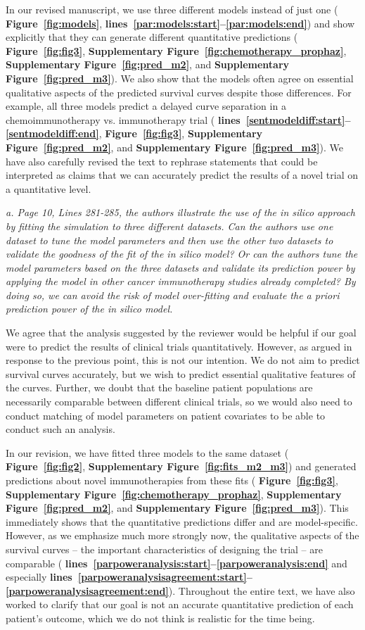 \documentclass{article}
\newcommand{\revr}[1]{{\color{gray} \itshape #1}}
\newcommand{\auth}[1]{{#1}}
\newcommand{\chng}[1]{{\color{blue!70!black} #1}}
\newcommand{\myref}[2]{{\bfseries\color{red!70!black} Figure~\ref{#1}#2}}
\newcommand{\mysupp}[2]{{\bfseries\color{red!70!black} Supplementary Figure~\ref{#1}#2}}
\newcommand{\lr}[1]{{\bfseries\color{red!70!black} lines~\ref{#1:start}--\ref{#1:end}}}
\begin{document}
\chng{In our revised manuscript, we use three different models instead of just one (\myref{fig:models}{},\lr{par:models}) and show explicitly that they can generate different quantitative predictions (\myref{fig:fig3}{}, \mysupp{fig:chemotherapy_prophaz}{}, \mysupp{fig:pred_m2}{}, and \mysupp{fig:pred_m3}{}). We also show that the models often agree on essential qualitative aspects of the predicted survival curves despite those differences. For example, all three models predict a delayed curve separation in a chemoimmunotherapy vs. immunotherapy trial (\lr{sentmodeldiff}, \myref{fig:fig3}{},  \mysupp{fig:pred_m2}{}, and \mysupp{fig:pred_m3}{}). We have also carefully revised the text to rephrase statements that could be interpreted as claims that we can accurately predict the results of a novel trial on a quantitative level.}

\revr{a. Page 10, Lines 281-285, the authors illustrate the use of the \emph{in silico} approach by fitting the simulation to three different datasets. Can the authors use one dataset to tune the model parameters and then use the other two datasets to validate the goodness of the fit of the in silico model? Or can the authors tune the model parameters based on the three datasets and validate its prediction power by applying the model in other cancer immunotherapy studies already completed? By doing so, we can avoid the risk of model over-fitting and evaluate the a priori prediction power of the in silico model.}

\auth{We agree that the analysis suggested by the reviewer would be helpful if our goal were to predict the results of clinical trials quantitatively. However, as argued in response to the previous point, this is not our intention. We do not aim to predict survival curves accurately, but we wish to predict essential qualitative features of the curves. Further, we doubt that the baseline patient populations are necessarily comparable between different clinical trials, so we would also need to conduct matching of model parameters on patient covariates to be able to conduct such an analysis.
}

\chng{
In our revision, we have fitted three models to the same dataset (\myref{fig:fig2}{},\mysupp{fig:fits_m2_m3}{}) and generated predictions about novel immunotherapies from these fits (\myref{fig:fig3}{}, \mysupp{fig:chemotherapy_prophaz}{}, \mysupp{fig:pred_m2}{}, and \mysupp{fig:pred_m3}{}). This immediately shows that the quantitative predictions differ and are model-specific. However, as we emphasize much more strongly now, the qualitative aspects of the survival curves -- the important characteristics of designing the trial -- are comparable (\lr{parpoweranalysis} and especially \lr{parpoweranalysisagreement}). Throughout the entire text, we have also worked to clarify that our goal is not an accurate quantitative prediction of each patient's outcome, which we do not think is realistic for the time being.
}
\end{document}
